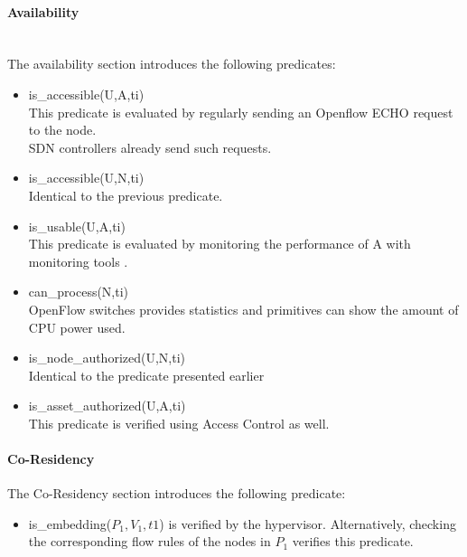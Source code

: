 \paragraph{Availability}\textbf{\\}
The availability section introduces the following predicates:
\begin{itemize}
\item is\_accessible(U,A,ti)
\\ This predicate is evaluated by regularly sending an Openflow ECHO request to the node.
\\ SDN controllers already send such requests.

\item is\_accessible(U,N,ti)
\\Identical to the previous predicate.

\item is\_usable(U,A,ti)
\\This predicate is evaluated by monitoring the performance of A with monitoring tools .


\item can\_process(N,ti)
\\ OpenFlow switches provides statistics and primitives can show the amount of CPU power used.

\item is\_node\_authorized(U,N,ti)\\
Identical to the predicate presented earlier

\item is\_asset\_authorized(U,A,ti)\\
This predicate is verified using Access Control as well.
\end{itemize}


 
 
\paragraph{Co-Residency}
The Co-Residency section introduces the following predicate:

\begin{itemize}
    \item is\_embedding($P_1,V_1,t1$) is verified by the hypervisor. Alternatively, checking the corresponding flow rules of the nodes in $P_1$ verifies this predicate.
\end{itemize}